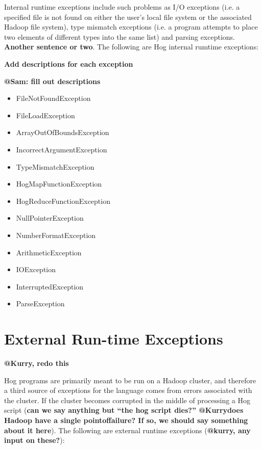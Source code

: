 \documentclass{book}
\begin{document}
Internal run­time exceptions include such problems as I/O exceptions (i.e. a
specified file is not found on either the user’s local file system or the
associated Hadoop file system), type mismatch exceptions (i.e. a program attempts
to place two elements of different types into the same list) and parsing
exceptions. \textbf{Another sentence or two}. The following are Hog internal
rum­time exceptions:

\textbf{Add descriptions for each exception}

\textbf{@Sam: fill out descriptions}

\begin{itemize}
  \item[] FileNotFoundException
  \item[] FileLoadException
  \item[] ArrayOutOfBoundsException
  \item[] IncorrectArgumentException
  \item[] TypeMismatchException
  \item[] HogMapFunctionException
  \item[] HogReduceFunctionException
  \item[] NullPointerException
  \item[] NumberFormatException
  \item[] ArithmeticException
  \item[] IOException
  \item[] InterruptedException
  \item[] ParseException
\end{itemize}


\section{External Run-time Exceptions} %
\label{sec:external_run_time_exceptions}

\textbf{@Kurry, redo this}

Hog programs are primarily meant to be run on a Hadoop cluster, and therefore a
third source of exceptions for the language comes from errors associated with the
cluster. If the cluster becomes corrupted in the middle of processing a Hog script
(\textbf{can we say anything but ``the hog script dies?'' @Kurry­­­does Hadoop
have a single point­of­failure? If so, we should say something about it here}).
The following are external run­time exceptions (\textbf{@kurry, any input on
these?}):
\end{document}

